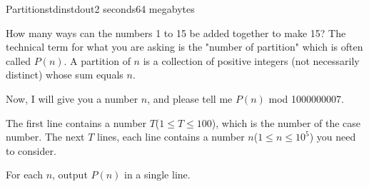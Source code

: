 \begin{problem}{Partition}{stdin}{stdout}{2 seconds}{64 megabytes}

How many ways can the numbers 1 to 15 be added together to make 15? The technical term for what you are asking is the "number of partition" which is often called $P(n)$. A partition of $n$ is a collection of positive integers (not necessarily distinct) whose sum equals $n$.

Now, I will give you a number $n$, and please tell me $P(n)$ mod 1000000007.

\InputFile
The first line contains a number $T$($1\leq T \leq 100$), which is the number of the case number.
The next $T$ lines, each line contains a number $n$($1\leq n \leq 10^5$) you need to consider.

\OutputFile
For each $n$, output $P(n)$ in a single line.

\Examples

\begin{example}
%
\end{example}

\end{problem}
